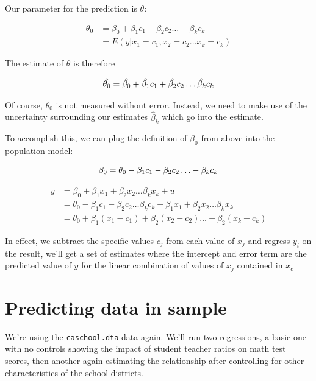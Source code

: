 \documentclass[12pt]{article}
\begin{document}
Our parameter for the prediction is $\theta$:

  \begin{align*}
  \theta_0&=\beta_0+\beta_1 c_1+ \beta_2 c_2 \ldots  +\beta_k c_k\\
         &=E(y|x_1=c_1,x_2=c_2 . . .x_k=c_k)
 \end{align*}

The estimate of $\theta$ is therefore

\begin{equation*}
\hat{\theta_0}=\hat{\beta_0}+\hat{\beta_1} c_1+ \hat{\beta_2} c_2 \ldots  \hat{\beta_k} c_k\\  
\end{equation*}

Of course, $\theta_0$ is not measured without error. Instead, we need
to make use of the uncertainty surrounding our estimates
$\hat{\beta}_k$ which go into the estimate. 

To accomplish this, we can plug the definition of $\beta_0$ from above
into the population model: 

\begin{equation*}
  \beta_0=\theta_0-\beta_1 c_1- \beta_2 c_2 \ldots  -\beta_k c_k\\
\end{equation*}

\begin{align*}
  y&=\beta_0+\beta_1 x_1+ \beta_2 x_2 \ldots \beta_k x_k+u\\
   &=\theta_0-\beta_1 c_1- \beta_2 c_2 \ldots  \beta_k c_k +\beta_1
   x_1+ \beta_2 x_2 \ldots \beta_k x_k\\
   &=\theta_0 +\beta_1(x_1-c_1)+\beta_2(x_2-c_2) \ldots +\beta_2(x_k-c_k)
\end{align*}

In effect, we subtract the specific values $c_j$ from each value of
$x_j$ and regress $y_i$ on the result, we'll get a set of estimates
where the intercept and error term are the predicted value of $y$ for
the linear combination of values of $x_j$ contained in $x_c$

\section{Predicting data in sample}
\label{sec:pred-data-sample}

We're using the \texttt{caschool.dta} data again. We'll run two
regressions, a basic one with no controls showing the impact of
student teacher ratios on math test scores, then another again
estimating the relationship after controlling for other
characteristics of the school districts. 
\end{document}
